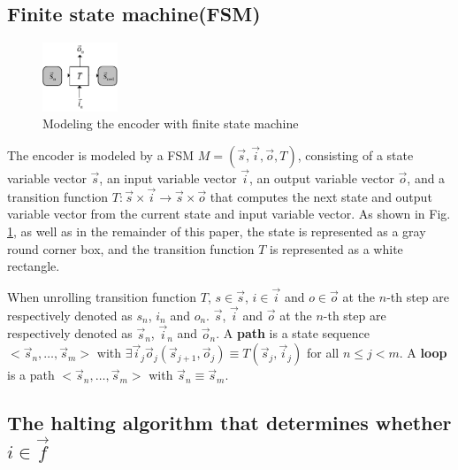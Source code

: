 \documentclass[conference]{IEEEtran}
\begin{document}
\subsection{Finite state machine(FSM)}\label{subsec_fsm}

\begin{figure}[b]
\begin{center}
\includegraphics[width=0.2\textwidth]{mealy}
\end{center}
\caption{Modeling the encoder with finite state machine}
\label{fig_mealy}
\end{figure}

The encoder is modeled by a FSM $M=(\vec{s},\vec{i},\vec{o},T)$,
consisting of a state variable vector $\vec{s}$,
an input variable vector $\vec{i}$,
an output variable vector $\vec{o}$,
and a transition function $T: \vec{s}\times \vec{i}\to \vec{s}\times \vec{o}$ 
that computes the next state and output variable vector from the current state and input variable vector.
As shown in Fig. \ref{fig_mealy},
as well as in the remainder of this paper,
the state is represented as a gray round corner box,
and the transition function $T$ is represented as a white rectangle.

When unrolling transition function $T$,
$s\in\vec{s}$,  $i\in\vec{i}$ and  $o\in\vec{o}$ at the $n$-th step 
are respectively denoted as $s_n$, $i_n$ and $o_n$.
$\vec{s}$, $\vec{i}$ and $\vec{o}$ at the $n$-th step are respectively denoted as $\vec{s}_n$, $\vec{i}_n$ and $\vec{o}_n$.
A \textbf{path} is a state sequence $<\vec{s}_n,\dots,\vec{s}_m>$ with $\exists \vec{i}_j\vec{o}_j (\vec{s}_{j+1},\vec{o}_j)\equiv T(\vec{s}_j,\vec{i}_j)$ for all $n\le j< m$.
A \textbf{loop} is a path $<\vec{s}_n,\dots,\vec{s}_m>$ with $\vec{s}_n\equiv \vec{s}_m$.



\subsection{The halting algorithm that determines whether $i\in\vec{f}$}\label{subsec_chkextdec}
\end{document}
